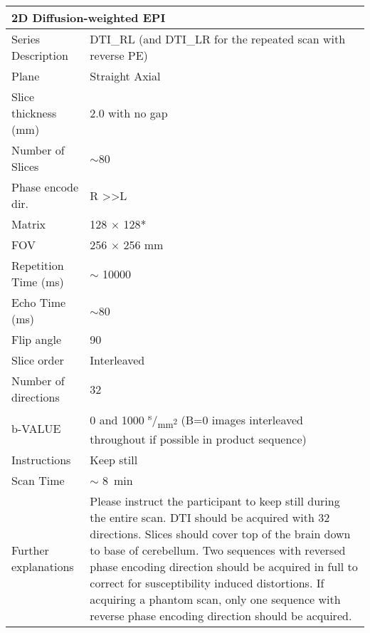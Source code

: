 \begin{tabularx}{\linewidth}{@{} s | X @{}}
\caption{Details on 2D Diffusion-weighted EPI}\\
\toprule
{} \\
\midrule 
Series Description   & \ac{DTI}\_RL (and \ac{DTI}\_LR for the repeated scan with reverse PE) \\
Plane                & Straight Axial                                                        \\
Slice thickness (mm) & 2.0 with no gap                                                       \\
Number of Slices     & $\sim$80                                                              \\
Phase encode dir.    & R \textgreater{}\textgreater L                                        \\
Matrix               & 128 $\times$ 128*                                                     \\
\ac{FOV}             & 256 $\times$ 256 mm                                                   \\
Repetition Time (ms) & $\sim$ \num{10000}                                                    \\
Echo Time (ms)       & $\sim$80                                                              \\
Flip angle           & 90                                                                    \\
Slice order          & Interleaved                                                           \\
Number of directions & 32                                                                    \\
b-VALUE              & 0 and 1000 \textsuperscript{s}/\textsubscript{mm\textsuperscript{2}}
                       (B=0 images interleaved throughout if possible in product sequence)   \\
Instructions         & Keep still                                                            \\
Scan Time            & $\sim$ \SI{8}{\minute}                                                \\
Further explanations & Please instruct the participant to keep still
                       during the entire scan. \ac{DTI} should be
                       acquired with 32 directions. Slices should
                       cover top of the brain down to base of
                       cerebellum. Two sequences with reversed phase
                       encoding direction should be acquired in full
                       to correct for susceptibility induced
                       distortions. If acquiring a phantom scan, only
                       one sequence with reverse phase encoding
                       direction should be acquired.                                         \\
\end{tabularx}
